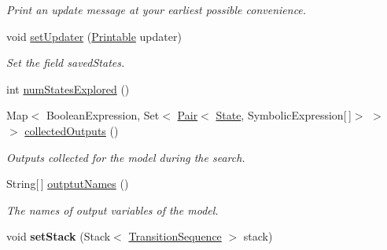 \begin{DoxyCompactItemize}
\begin{DoxyCompactList}\small\item\em Print an update message at your earliest possible convenience. \end{DoxyCompactList}\item 
void \hyperlink{interfaceedu_1_1udel_1_1cis_1_1vsl_1_1civl_1_1kripke_1_1IF_1_1StateManager_ad6cce98c896c85fe31d988fbffc83a36}{set\+Updater} (\hyperlink{interfaceedu_1_1udel_1_1cis_1_1vsl_1_1civl_1_1util_1_1IF_1_1Printable}{Printable} updater)
\begin{DoxyCompactList}\small\item\em Set the field saved\+States. \end{DoxyCompactList}\item 
int \hyperlink{interfaceedu_1_1udel_1_1cis_1_1vsl_1_1civl_1_1kripke_1_1IF_1_1StateManager_ab273d8fda97ccae5dd7d61d0072c2b71}{num\+States\+Explored} ()
\item 
Map$<$ Boolean\+Expression, Set$<$ \hyperlink{classedu_1_1udel_1_1cis_1_1vsl_1_1civl_1_1util_1_1IF_1_1Pair}{Pair}$<$ \hyperlink{interfaceedu_1_1udel_1_1cis_1_1vsl_1_1civl_1_1state_1_1IF_1_1State}{State}, Symbolic\+Expression\mbox{[}$\,$\mbox{]}$>$ $>$ $>$ \hyperlink{interfaceedu_1_1udel_1_1cis_1_1vsl_1_1civl_1_1kripke_1_1IF_1_1StateManager_a61f3ebc346e0656082cef4a71bc82d22}{collected\+Outputs} ()
\begin{DoxyCompactList}\small\item\em Outputs collected for the model during the search. \end{DoxyCompactList}\item 
String\mbox{[}$\,$\mbox{]} \hyperlink{interfaceedu_1_1udel_1_1cis_1_1vsl_1_1civl_1_1kripke_1_1IF_1_1StateManager_a3c9b5cae52bc1f513dc1d02db8550dfe}{outptut\+Names} ()
\begin{DoxyCompactList}\small\item\em The names of output variables of the model. \end{DoxyCompactList}\item 
\hypertarget{interfaceedu_1_1udel_1_1cis_1_1vsl_1_1civl_1_1kripke_1_1IF_1_1StateManager_af5f3eeb8cd9e4071b5d75dcd301320db}{}void {\bfseries set\+Stack} (Stack$<$ \hyperlink{interfaceedu_1_1udel_1_1cis_1_1vsl_1_1civl_1_1semantics_1_1IF_1_1TransitionSequence}{Transition\+Sequence} $>$ stack)\label{interfaceedu_1_1udel_1_1cis_1_1vsl_1_1civl_1_1kripke_1_1IF_1_1StateManager_af5f3eeb8cd9e4071b5d75dcd301320db}

\end{DoxyCompactItemize}


